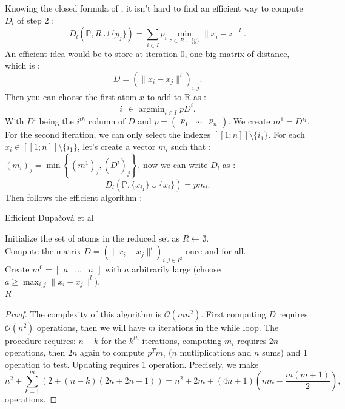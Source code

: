 \documentclass{amsart}
\newcommand{\argmin}{\mathop{\arg\min}}
\begin{document}
Knowing the closed formula of , it isn't hard to find an efficient way to compute $D_l$ of step 2 : 
$$
D_l\left(\mathbb{P},R\cup \{y_j\}\right)=\sum_{i\in I}p_i\min_{z\in R\cup\{y\}}\lVert x_i-z \rVert^l.
$$
An efficient idea would be to store at iteration $0$, one big matrix of distance, which is : 
$$
D = \left(\lVert x_i-x_j\rVert ^l \right)_{i,j}.
$$
Then you can choose the first atom $x$ to add to R as :
$$
i_1 \in \argmin_{i\in I} pD^i.
$$
With $D^i$ being the $i^{th}$ column of $D$ and $p=\begin{pmatrix}
    p_1 & \hdots & p_n
\end{pmatrix}$.
We create $m^1=D^{i_1}$. For the second iteration, we can only select the indexes $[\![1;n]\!]\setminus \{i_1\}$. For each $x_i\in [\![1;n]\!]\setminus \{i_1\}$, let's create a vector $m_i$ such that : $\left(m_i\right)_j=\min\left\{\left(m^1\right)_j,\left(D^i\right)_j\right\}$, now we can write $D_l$ as : $$
D_l\left(\mathbb{P},\{x_{i_1}\}\cup \{x_i\}\right)=pm_i.
$$
Then follows the efficient algorithm :
\begin{algorithm}
\caption{Efficient Dupačová et al}
Initialize the set of atoms in the reduced set as $R \gets \emptyset$.\\
Compute the matrix $D = \left(\| x_i - x_j \|^l \right)_{i,j \in I^2}$ once and for all.\\
Create $m^0 = \begin{bmatrix} a & \hdots & a \end{bmatrix}$ with $a$ arbitrarily large (choose $a \geq \max_{i,j} \| x_i - x_j \|^l$).\\
\Return $R$\\
\end{algorithm}
\begin{proof}\label{complexity}
The complexity of this algorithm is $\mathcal{O}\left(mn^2\right)$. First computing $D$ requires $\mathcal{O}\left(n^2\right)$ operations, then we will have $m$ iterations in the while loop. The procedure requires: $n-k$ for the $k^{th}$ iterations, computing $m_i$ requires $2n$ operations, then $2n$ again to compute $p^Tm_i$ ($n$ mutliplications and $n$ sums) and 1 operation to test. Updating requires 1 operation.
Precisely, we make
$$
n^2+\sum_{k=1}^m\left(2+\left(n-k\right)\left(2n+2n+1\right)\right)= n^2+2m+\left(4n+1\right)\left(mn-\frac{m\left(m+1\right)}{2}\right),
$$
operations.
\end{proof}
\end{document}
